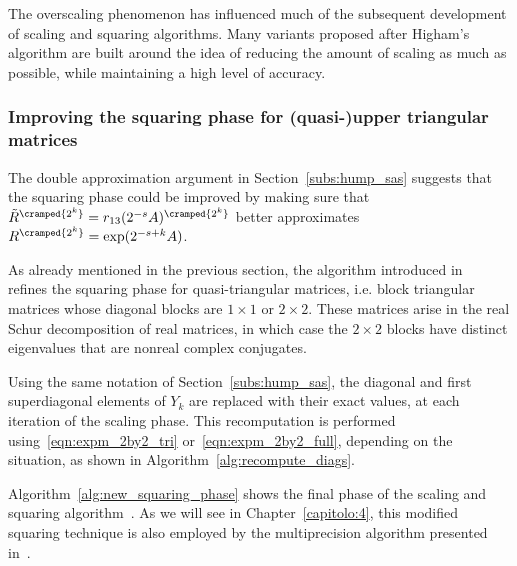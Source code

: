 \begin{oss*}
	The overscaling phenomenon has influenced much of the subsequent development of scaling and squaring algorithms. Many variants proposed after Higham's algorithm are built around the idea of reducing the amount of scaling as much as possible, while maintaining a high level of accuracy.
\end{oss*}

\subsubsection{Improving the squaring phase for (quasi-)upper triangular matrices}\label{subs:impr_sq_phase}
The double approximation argument in Section~\ref{subs:hump_sas} suggests that the squaring phase could be improved by making sure that $\tilde{R}^{\cramped{2^k}}=r_{13}(2^{-s}A)^{\cramped{2^k}}$ better approximates $R^{\cramped{2^k}}=\exp(2^{-s+k}A)$.
\smallskip 

As already mentioned in the previous section, the algorithm introduced in~\cite{higham:alhi09_new} refines the squaring phase for quasi-triangular matrices, i.e. block triangular matrices whose diagonal blocks are $1\times 1$ or $2\times 2$. These matrices arise in the real Schur decomposition of real matrices, in which case the $2\times 2$ blocks have distinct eigenvalues that are nonreal complex conjugates.

Using the same notation of Section~\ref{subs:hump_sas}, the diagonal and first superdiagonal elements of $Y_k$ are replaced with their exact values, at each iteration of the scaling phase. This recomputation is performed using~\eqref{eqn:expm_2by2_tri} or~\eqref{eqn:expm_2by2_full}, depending on the situation, as shown in Algorithm~\ref{alg:recompute_diags}. 

Algorithm~\ref{alg:new_squaring_phase} shows the final phase of the scaling and squaring algorithm~\cite{higham:alhi09_new}. As we will see in Chapter~\ref{capitolo:4}, this modified squaring technique is also employed by the multiprecision algorithm presented in~\cite{higham:hf19_mpexpm}.

